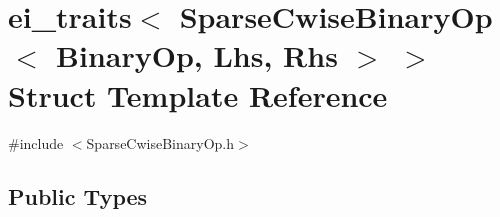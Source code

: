 \hypertarget{structei__traits_3_01_sparse_cwise_binary_op_3_01_binary_op_00_01_lhs_00_01_rhs_01_4_01_4}{\section{ei\-\_\-traits$<$ Sparse\-Cwise\-Binary\-Op$<$ Binary\-Op, Lhs, Rhs $>$ $>$ Struct Template Reference}
\label{structei__traits_3_01_sparse_cwise_binary_op_3_01_binary_op_00_01_lhs_00_01_rhs_01_4_01_4}
}


{\ttfamily \#include $<$Sparse\-Cwise\-Binary\-Op.\-h$>$}

\subsection*{Public Types}
